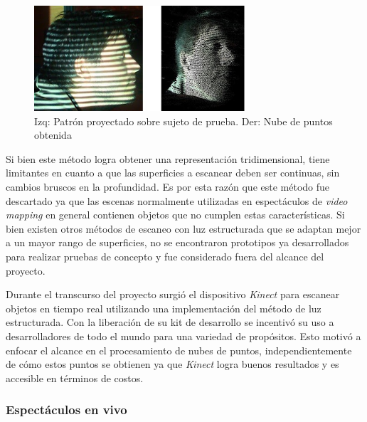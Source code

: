 \begin{figure}[H]
  \centering
    \includegraphics[width=0.7\textwidth]{./Cap7_conclusiones/Phase2.JPG}
  \caption[Imagen propia]{Izq: Patrón proyectado sobre sujeto de prueba. Der: Nube de puntos obtenida}
  \label{fig:cabeza}
\end{figure}

Si bien este método logra obtener una representación tridimensional, tiene limitantes en cuanto a que las superficies a escanear deben ser continuas, sin cambios bruscos en la profundidad. Es por esta razón que este método fue descartado ya que las escenas normalmente utilizadas en espectáculos de \emph{video mapping} en general contienen objetos que no cumplen estas características.
Si bien existen otros métodos de escaneo con luz estructurada que se adaptan mejor a un mayor rango de superficies, no se encontraron prototipos ya desarrollados para realizar pruebas de concepto y fue considerado fuera del alcance del proyecto.

Durante el transcurso del proyecto surgió el dispositivo \emph{Kinect} para escanear objetos en tiempo real utilizando una implementación del método de luz estructurada. Con la liberación de su kit de desarrollo se incentivó su uso a desarrolladores de todo el mundo para una variedad de propósitos. Esto motivó a enfocar el alcance en el procesamiento de nubes de puntos, independientemente de cómo estos puntos se obtienen ya que \emph{Kinect} logra buenos resultados y es accesible en términos de costos.

\subsubsection{Espectáculos en vivo}

